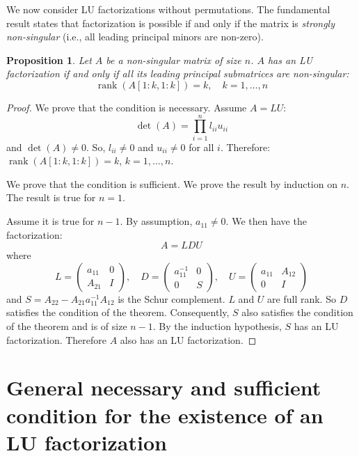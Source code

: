\documentclass{article}
\DeclareMathOperator{\rk}{rank}
\newtheorem{proposition}{Proposition}[section]
\begin{document}
We now consider LU factorizations without permutations. The fundamental result states that factorization is possible if and only if the matrix is \emph{strongly non-singular} (i.e., all leading principal minors are non-zero).

\begin{proposition}\label{prop:sufficient}
    Let $A$ be a non-singular matrix of size $n$. $A$ has an LU factorization if and only if all its leading principal submatrices are non-singular:
    \[
        \rk(A[1:k,1:k]) = k, \quad k = 1, \ldots, n
    \]
\end{proposition}

\begin{proof}
    We prove that the condition is necessary. Assume $A = LU$:
    \[ \det(A) = \prod_{i=1}^n l_{ii} u_{ii} \]
    and $\det(A) \neq 0$. So, $l_{ii} \neq 0$ and $u_{ii} \neq 0$ for all $i$. Therefore: $\rk(A[1:k,1:k]) = k$, $k = 1, \ldots, n$.

    We prove that the condition is sufficient. We prove the result by induction on $n$. The result is true for $n=1$.

    Assume it is true for $n-1$. By assumption, $a_{11} \neq 0$. We then have the factorization:
    \[
        A = LDU
    \]
    where
    \[
        L = \begin{pmatrix}
            a_{11} & 0 \\
            A_{21} & I
        \end{pmatrix}, \quad
        D = \begin{pmatrix}
            a_{11}^{-1} & 0 \\
            0           & S
        \end{pmatrix}, \quad
        U = \begin{pmatrix}
            a_{11} & A_{12} \\
            0      & I
        \end{pmatrix}
    \]
    and $S = A_{22} - A_{21} a_{11}^{-1} A_{12}$ is the Schur complement. $L$ and $U$ are full rank. So $D$ satisfies the condition of the theorem. Consequently, $S$ also satisfies the condition of the theorem and is of size $n-1$. By the induction hypothesis, $S$ has an LU factorization. Therefore $A$ also has an LU factorization.
\end{proof}

\section{General necessary and sufficient condition for the existence of an LU factorization}\label{sec:main}
\end{document}
